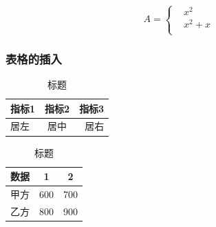 \documentclass[UTF8]{ctexart}
\begin{document}
\begin{equation}
	A=\begin{cases}
		 & x^2 \\&x^2+x\\
	\end{cases}
\end{equation}

\subsubsection{表格的插入}

\begin{table}[!htbp]
	\centering
	\caption{标题}
	\begin{tabular}{|l|c|r|}

		\hline
		指标1 & 指标2 & 指标3 \\
		\hline
		居左  & 居中  & 居右  \\
		\hline
	\end{tabular}
\end{table}


\begin{table}[!htbp]
	\centering
	\caption{标题}
	\begin{tabular}{ccc}
		\toprule
		数据 & 1   & 2   \\
		\midrule
		甲方 & 600 & 700 \\
		乙方 & 800 & 900 \\
		\bottomrule
	\end{tabular}
\end{table}
\end{document}
